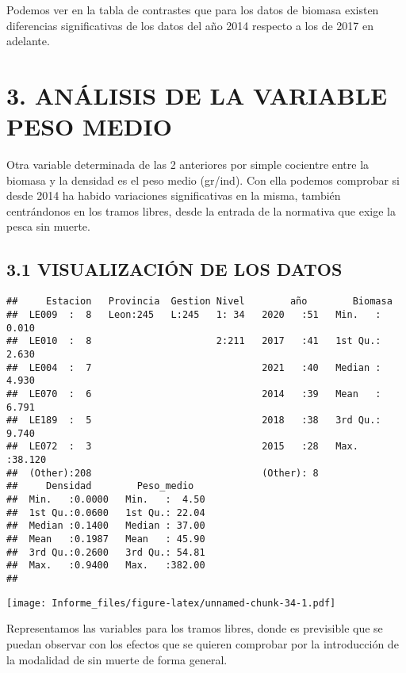 \documentclass[
]{article}
\begin{document}
Podemos ver en la tabla de contrastes que para los datos de biomasa
existen diferencias significativas de los datos del año 2014 respecto a
los de 2017 en adelante.

\hypertarget{anuxe1lisis-de-la-variable-peso-medio}{%
\section{3. ANÁLISIS DE LA VARIABLE PESO
MEDIO}\label{anuxe1lisis-de-la-variable-peso-medio}}

Otra variable determinada de las 2 anteriores por simple cocientre entre
la biomasa y la densidad es el peso medio (gr/ind). Con ella podemos
comprobar si desde 2014 ha habido variaciones significativas en la
misma, también centrándonos en los tramos libres, desde la entrada de la
normativa que exige la pesca sin muerte.

\hypertarget{visualizaciuxf3n-de-los-datos-2}{%
\subsection{3.1 VISUALIZACIÓN DE LOS
DATOS}\label{visualizaciuxf3n-de-los-datos-2}}

\begin{verbatim}
##     Estacion   Provincia  Gestion Nivel        año        Biomasa      
##  LE009  :  8   Leon:245   L:245   1: 34   2020   :51   Min.   : 0.010  
##  LE010  :  8                      2:211   2017   :41   1st Qu.: 2.630  
##  LE004  :  7                              2021   :40   Median : 4.930  
##  LE070  :  6                              2014   :39   Mean   : 6.791  
##  LE189  :  5                              2018   :38   3rd Qu.: 9.740  
##  LE072  :  3                              2015   :28   Max.   :38.120  
##  (Other):208                              (Other): 8                   
##     Densidad        Peso_medio    
##  Min.   :0.0000   Min.   :  4.50  
##  1st Qu.:0.0600   1st Qu.: 22.04  
##  Median :0.1400   Median : 37.00  
##  Mean   :0.1987   Mean   : 45.90  
##  3rd Qu.:0.2600   3rd Qu.: 54.81  
##  Max.   :0.9400   Max.   :382.00  
## 
\end{verbatim}

\texttt{[image: Informe\_files/figure-latex/unnamed-chunk-34-1.pdf]}

Representamos las variables para los tramos libres, donde es previsible
que se puedan observar con los efectos que se quieren comprobar por la
introducción de la modalidad de sin muerte de forma general.
\end{document}
